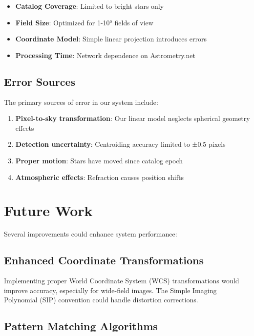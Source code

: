 \documentclass[11pt,a4paper]{article}
\begin{document}
\begin{itemize}
    \item \textbf{Catalog Coverage}: Limited to bright stars only
    \item \textbf{Field Size}: Optimized for 1-10° fields of view
    \item \textbf{Coordinate Model}: Simple linear projection introduces errors
    \item \textbf{Processing Time}: Network dependence on Astrometry.net
\end{itemize}

\subsection{Error Sources}

The primary sources of error in our system include:

\begin{enumerate}
    \item \textbf{Pixel-to-sky transformation}: Our linear model neglects spherical geometry effects
    \item \textbf{Detection uncertainty}: Centroiding accuracy limited to ±0.5 pixels
    \item \textbf{Proper motion}: Stars have moved since catalog epoch
    \item \textbf{Atmospheric effects}: Refraction causes position shifts
\end{enumerate}

\section{Future Work}

Several improvements could enhance system performance:

\subsection{Enhanced Coordinate Transformations}

Implementing proper World Coordinate System (WCS) transformations would improve accuracy, especially for wide-field images. The Simple Imaging Polynomial (SIP) convention could handle distortion corrections.

\subsection{Pattern Matching Algorithms}
\end{document}
